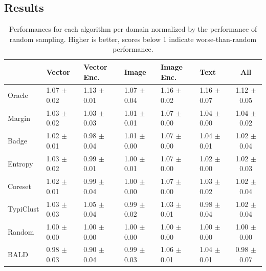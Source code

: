 \documentclass[]{article}
\begin{document}
\subsection{Results}


\begin{table}[]
	\hspace{-5mm}
	\begin{tabular}{l|lllll|c}
		& Vector       & Vector Enc. & Image        & Image Enc. & Text         & All          \\
		\hline
		Oracle          & 1.07 $\pm$ 0.02 & 1.13 $\pm$ 0.01    & 1.07 $\pm$ 0.04 & 1.16 $\pm$ 0.02   & 1.16 $\pm$ 0.07 & 1.12 $\pm$ 0.05 \\
		Margin     & 1.03 $\pm$ 0.02 & 1.03 $\pm$ 0.03    & 1.01 $\pm$ 0.01 & 1.07 $\pm$ 0.00   & 1.04 $\pm$ 0.00 & 1.04 $\pm$ 0.02 \\
		Badge           & 1.02 $\pm$ 0.01 & 0.98 $\pm$ 0.04    & 1.01 $\pm$ 0.00 & 1.07 $\pm$ 0.00   & 1.04 $\pm$ 0.01 & 1.02 $\pm$ 0.04 \\
		Entropy  & 1.03 $\pm$ 0.02 & 0.99 $\pm$ 0.01    & 1.00 $\pm$ 0.01 & 1.07 $\pm$ 0.00   & 1.02 $\pm$ 0.00 & 1.02 $\pm$ 0.03 \\
		Coreset & 1.02 $\pm$ 0.01 & 0.99 $\pm$ 0.04    & 1.00 $\pm$ 0.00 & 1.07 $\pm$ 0.00   & 1.03 $\pm$ 0.02 & 1.02 $\pm$ 0.04 \\
		TypiClust       & 1.03 $\pm$ 0.03 & 1.05 $\pm$ 0.04    & 0.99 $\pm$ 0.02 & 1.03 $\pm$ 0.01   & 0.98 $\pm$ 0.04 & 1.02 $\pm$ 0.04 \\
		Random     & 1.00 $\pm$ 0.00 & 1.00 $\pm$ 0.00    & 1.00 $\pm$ 0.00 & 1.00 $\pm$ 0.00   & 1.00 $\pm$ 0.00 & 1.00 $\pm$ 0.00 \\
		BALD            & 0.98 $\pm$ 0.03 & 0.90 $\pm$ 0.04    & 0.99 $\pm$ 0.03 & 1.06 $\pm$ 0.01   & 1.04 $\pm$ 0.01 & 0.98 $\pm$ 0.07
	\end{tabular}
	\caption{Performances for each algorithm per domain normalized by the performance of random sampling. Higher is better, scores below 1 indicate worse-than-random performance.}
	\label{tab:results}
\end{table}
%
\end{document}
